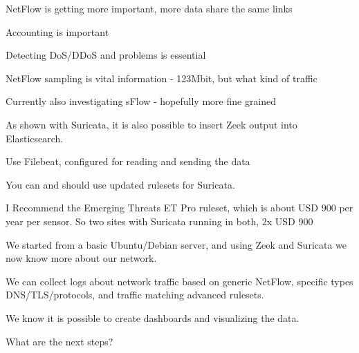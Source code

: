 \documentclass[Screen16to9,17pt]{foils}
\begin{document}

\begin{slidelist}
\item NetFlow is getting more important, more data share the same links
\item Accounting is important
\item Detecting DoS/DDoS and problems is essential
\item NetFlow sampling is vital information - 123Mbit, but what kind of traffic
\item Currently also investigating sFlow - hopefully more fine grained
\end{slidelist}





As shown with Suricata, it is also possible to insert Zeek output into Elasticsearch.

Use Filebeat, configured for reading and sending the data



You can and should use updated rulesets for Suricata.

I Recommend the Emerging Threats ET Pro ruleset, which is about USD 900 per year per sensor. So two sites with Suricata running in both, 2x USD 900


We started from a basic Ubuntu/Debian server, and using Zeek and Suricata we now know more about our network.

We can collect logs about network traffic based on generic NetFlow, specific types DNS/TLS/protocols, and traffic matching advanced rulesets.

We know it is possible to create dashboards and visualizing the data.

What are the next steps?


\myquestionspage
\end{document}
